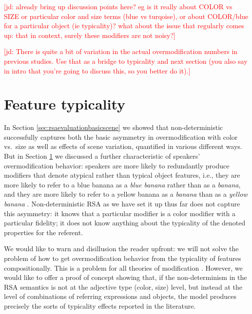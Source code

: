 \documentclass[11pt]{article}
\newcommand{\jd}[1]{\textcolor{Red}{[jd: #1]}}
\newcommand{\sectionref}[1]{Section \ref{#1}}
\begin{document}
\jd{already bring up discussion points here? eg is it really about COLOR vs SIZE or particular color and size terms (blue vs turqoise), or about COLOR/blue for a particular object (ie typicality)? what about the issue that regularly comes up: that in context, surely these modifiers are not noisy?}

\jd{There is quite a bit of variation in the actual overmodification numbers in previous studies. Use that as a bridge to typicality and next section (you also say in intro that you're going to discuss this, so you better do it).} 



\section{Feature typicality}
\label{sec:colortypicality}

In \sectionref{sec:rsaevaluationbasicscene} we showed that non-deterministic successfully captures both the basic asymmetry in overmodification with color vs.~size as well as effects of scene variation, quantified in various different ways. But in \sectionref{sec:colortypicality} we discussed a further characteristic of speakers' overmodification behavior: speakers are more likely to redundantly produce modifiers that denote atypical rather than typical object features, i.e., they are more likely to refer to a blue banana as a \emph{blue banana} rather than as a \emph{banana}, and they are more likely to refer to a yellow banana as a \emph{banana} than as a \emph{yellow banana} \cite{sedivy2003a, Westerbeek2015}. Non-deterministic RSA as we have set it up thus far does not capture this asymmetry: it knows that a particular modifier is a color modifier with a particular fidelity; it does not know anything about the typicality of the denoted properties for the referent. 

We would like to warn and disillusion the reader upfront: we will not solve the problem of how to get overmodification behavior from the typicality of features compositionally. This is a problem for all theories of modification \cite{kamp1995}. However, we would like to offer a proof of concept showing that, if the non-determinism in the RSA semantics is not at the adjective type (color, size) level, but instead at the level of combinations of referring expressions and objects, the model produces precisely the sorts of typicality effects reported in the literature. 
\end{document}
